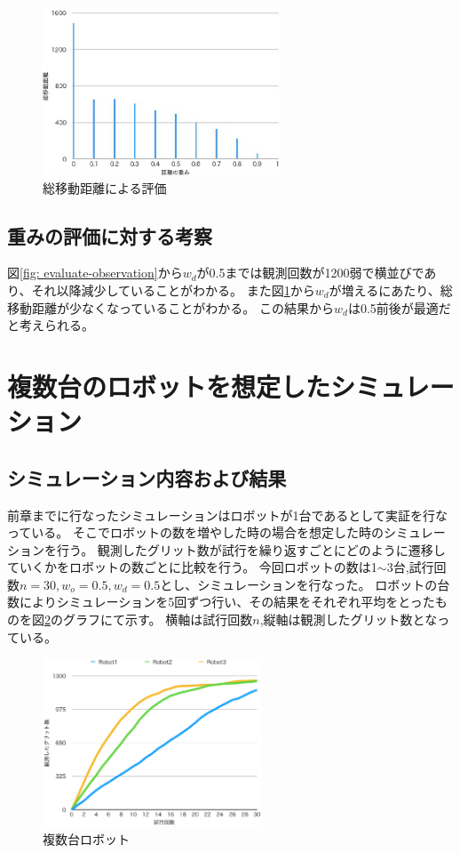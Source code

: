 \documentclass{jsarticle}
\begin{document}
\begin{figure}[tbh]
 \centering
  \includegraphics[height=50mm]{fig/evaluate-distance.eps}
  \vspace*{-4mm}
  \caption{総移動距離による評価}
  \label{fig: evaluate-distance}
\end{figure}

\subsection{重みの評価に対する考察}
図\ref{fig: evaluate-observation}から$w_d$が0.5までは観測回数が1200弱で横並びであり、それ以降減少していることがわかる。
また図\ref{fig: evaluate-distance}から$w_d$が増えるにあたり、総移動距離が少なくなっていることがわかる。
この結果から$w_d$は0.5前後が最適だと考えられる。

\section{複数台のロボットを想定したシミュレーション}
\subsection{シミュレーション内容および結果}

前章までに行なったシミュレーションはロボットが1台であるとして実証を行なっている。
そこでロボットの数を増やした時の場合を想定した時のシミュレーションを行う。
観測したグリット数が試行を繰り返すごとにどのように遷移していくかをロボットの数ごとに比較を行う。
今回ロボットの数は1$\sim$3台,試行回数$n=30,w_o=0.5,w_d=0.5$とし、シミュレーションを行なった。
ロボットの台数によりシミュレーションを5回ずつ行い、その結果をそれぞれ平均をとったものを図\ref{fig: multirobot}のグラフにて示す。
横軸は試行回数$n$,縦軸は観測したグリット数となっている。


\begin{figure}[tbh]
 \centering
  \includegraphics[height=50mm]{fig/multi-robot.eps}
  \vspace*{-4mm}
  \caption{複数台ロボット}
  \label{fig: multirobot}
\end{figure}
\end{document}
